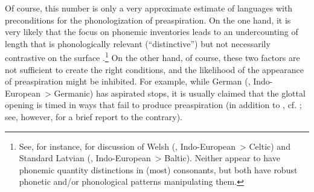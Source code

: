 \documentclass[output=paper,colorlinks,citecolor=brown]{langscibook}
\begin{document}
Of course, this number is only a very approximate estimate of languages with preconditions for the phonologization of preaspiration. On the one hand, it is very likely that the focus on phonemic inventories leads to an undercounting of length that is phonologically relevant (\enquote{distinctive}) but not necessarily contrastive on the surface \parencite{kiparsky:_phonol, kiparsky2017formal, iosad2017phonologization}.\footnote{See, for instance, \textcite{iosad2012representation} for discussion of Welsh (, Indo-European~> Celtic) and Standard Latvian (, Indo-European~> Baltic). Neither appear to have phonemic quantity distinctions in (most) consonants, but both have robust phonetic and/or phonological patterns manipulating them.} On the other hand, of course, these two factors are not sufficient to create the right conditions, and the likelihood of the appearance of preaspiration might be inhibited. For example, while German (, Indo-European~> Germanic) has aspirated {\VOICELESS} stops, it is usually claimed that the glottal opening is timed in ways that fail to produce preaspiration (in addition to \citealt{jessen1998phonetics}, cf. \citealt[231]{helgason}; see, however, \citealt{tronnier2019transitions} for a brief report to the contrary).
\end{document}
